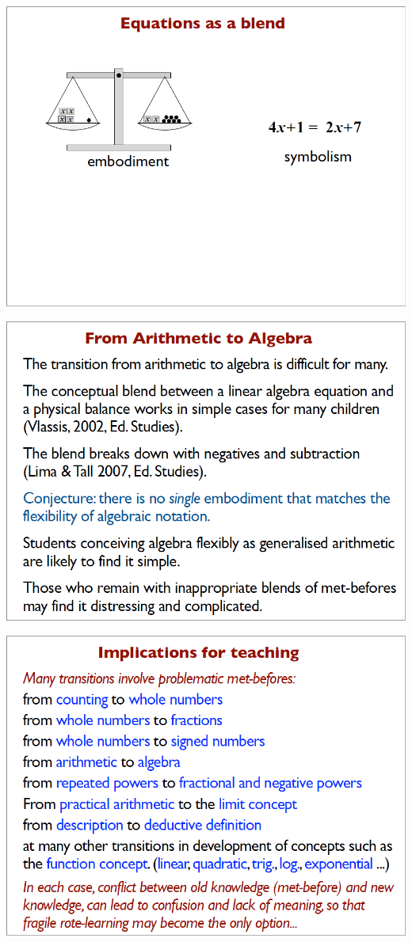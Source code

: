 \documentclass{article}
\begin{document}
\begin{minipage}[t]{0.32\linewidth} 
	\includegraphics[width=1\textwidth]{david_tall/dt19.png}
	
	\includegraphics[width=1\textwidth]{david_tall/dt22.png}
	
	\includegraphics[width=1\textwidth]{david_tall/dt25.png}
\end{minipage}
\end{document}
